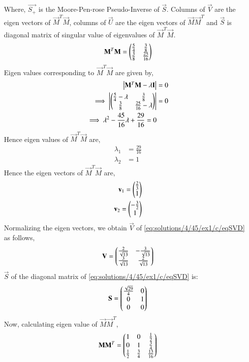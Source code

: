 Where, $\Vec{S_+}$ is the Moore-Pen-rose Pseudo-Inverse of $\Vec{S}$. Columns of $\vec{V}$ are the eigen vectors of $\vec{M}^T\vec{M}$, columns of $\vec{U}$ are the eigen vectors of $\vec{M}\vec{M}^T$ and $\vec{S}$ is diagonal matrix of singular value of eigenvalues of $\vec{M}^T\vec{M}$.
\begin{align}
\mathbf{M}^T\mathbf{M}=\begin{pmatrix}\frac{5}{4}&\frac{3}{8}\\\frac{3}{8}&\frac{25}{16}\end{pmatrix}\label{eq:solutions/4/45/ex1/c/eqMTM}
\end{align}
Eigen values corresponding to $\Vec{M}^T\Vec{M}$ are given by,
\begin{align}
\begin{vmatrix}\mathbf{M}^T\mathbf{M}-\lambda\mathbf{I}\end{vmatrix} &= 0\\
\implies\begin{vmatrix}\begin{pmatrix}\frac{5}{4}-\lambda&\frac{3}{8}\\\frac{3}{8}&\frac{25}{16}-\lambda\end{pmatrix}\end{vmatrix} &=0\\
\implies \lambda^2-\frac{45}{16}\lambda+\frac{29}{16}=0
\end{align}
Hence eigen values of $\vec{M}^T\vec{M}$ are,
\begin{align}
\lambda_1 &= \frac{29}{16}\\
\lambda_2 &= 1
\end{align}
Hence the eigen vectors of $\vec{M}^T\vec{M}$ are,
\begin{align}
\mathbf{v}_1=\begin{pmatrix}\frac{2}{3}\\1\end{pmatrix}\\
\mathbf{v}_2=\begin{pmatrix}-\frac{3}{2}\\1\end{pmatrix}
\end{align}
Normalizing the eigen vectors, we obtain $\vec{V}$ of \eqref{eq:solutions/4/45/ex1/c/eqSVD} as follows,
\begin{align}
\mathbf{V}=\begin{pmatrix}\frac{2}{\sqrt{13}}&-\frac{3}{\sqrt{13}}\\ \frac{3}{\sqrt{13}}&\frac{2}{\sqrt{13}}\end{pmatrix}\label{eq:solutions/4/45/ex1/c/eqV}
\end{align}
$\vec{S}$ of the diagonal matrix of \eqref{eq:solutions/4/45/ex1/c/eqSVD} is:
\begin{align}
\mathbf{S}=\begin{pmatrix}\frac{\sqrt{29}}{4}&0\\0&1\\0&0\end{pmatrix}\label{eq:solutions/4/45/ex1/c/eqS}
\end{align}
Now, calculating eigen value of $\vec{M}\vec{M}^T$,
\begin{align}
    \Vec{M}\Vec{M}^T=\myvec{1&0&\frac{1}{2}\\0&1&\frac{3}{4}\\\frac{1}{2}&\frac{3}{4}&\frac{13}{16}}
\end{align}
